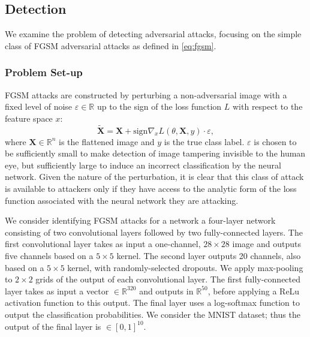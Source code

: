 \subsection{Detection}


We examine the problem of detecting adversarial attacks, focusing on the simple class of FGSM adversarial attacks as defined in \eqref{eq:fgsm}.

\subsubsection{Problem Set-up}\label{Setup}

FGSM attacks are constructed by perturbing a non-adversarial image with a fixed level of noise $\varepsilon \in \mathbb{R}$ up to the sign of the loss function $L$ with respect to the feature space $x$:
\begin{equation}
\mathbf{\tilde{X}}=\mathbf{X} + \text{sign}{\nabla_x L(\theta,\mathbf{X},y)}\cdot\varepsilon,
\end{equation}
where $\mathbf{X} \in \mathbb{R}^n$ is the flattened image and $y$ is the true class label. $\varepsilon$ is chosen to be sufficiently small to make detection of image tampering invisible to the human eye, but sufficiently large to induce an incorrect classification by the neural network. Given the nature of the perturbation, it is clear that this class of attack is available to attackers only if they have access to the analytic form of the loss function associated with the neural network they are attacking. 

\par 

We consider identifying FGSM attacks for a network a four-layer network consisting of two convolutional layers followed by two fully-connected layers. The first convolutional layer takes as input a one-channel, $28\times 28$ image and outputs five channels based on a $5\times 5$ kernel. The second layer outputs 20 channels, also based on a $5\times 5$ kernel, with randomly-selected dropouts. We apply max-pooling to $2\times 2$ grids of the output of each convolutional layer. The first fully-connected layer takes as input a vector $\in \mathbb{R}^{320}$ and outputs in $\mathbb{R}^{50}$, before applying a ReLu activation function to this output. The final layer uses a log-softmax function to output the classification probabilities. We consider the MNIST dataset; thus the output of the final layer is $\in [0,1]^{10}$.

